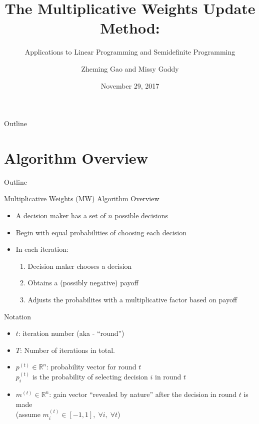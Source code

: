 \documentclass{beamer}
\title[MW Algorithm]{The Multiplicative Weights Update Method:}
\subtitle{Applications to Linear Programming and Semidefinite Programming}
\author[Gao, Gaddy]{Zheming Gao and Missy Gaddy}
\institute{Based on paper by Arora, Hazan, and Kale (2012)}
\date{November 29, 2017}
\begin{document}
\begin{frame}
  \titlepage
\end{frame}
\begin{frame}{Outline}
  \tableofcontents 
\end{frame}

\section{Algorithm Overview}
\begin{frame}{Outline}
  \tableofcontents[currentsection]
\end{frame}

\begin{frame}{Multiplicative Weights (MW) Algorithm Overview}
\begin{itemize}
\item A decision maker has a set of $n$ possible decisions
\item Begin with equal probabilities of choosing each decision
\item In each iteration:
\begin{enumerate}
\setlength\itemsep{1em}
\item Decision maker chooses a decision
\item Obtains a (possibly negative) payoff
\item Adjusts the probabilites with a multiplicative factor based on payoff
\end{enumerate}
\end{itemize}
\end{frame}

\begin{frame}{Notation}
\begin{itemize}
\setlength\itemsep{2em}
\item $t $: iteration number (aka - ``round'') 
\item $T$: Number of iterations in total.

\item $p^{(t)} \in \mathbb{R}^n$: probability vector for round $t$ \\
 $p^{(t)}_i$ is the probability of selecting decision $i$ in round $t$ \\
\item $m^{(t)} \in \mathbb{R}^n$: gain vector ``revealed by nature'' after the decision in round $t$ is made \\
 (assume $m_i^{(t)} \in [-1, 1], \; \forall i, \; \forall t$)
\end{itemize}
\end{frame}
\end{document}
